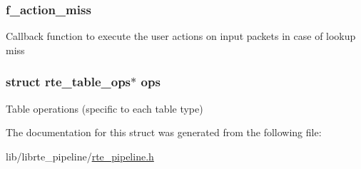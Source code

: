 \subsubsection[{f\+\_\+action\+\_\+miss}]{ f\+\_\+action\+\_\+miss}\label{structrte__pipeline__table__params_aaa5e9294a7d2b1c271683726263fcb46}
Callback function to execute the user actions on input packets in case of lookup miss \hypertarget{structrte__pipeline__table__params_ad1966fbeee5c7e1923a4e567b5bcd77d}{}
\subsubsection[{ops}]{\setlength{\rightskip}{0pt plus 5cm}struct {\bf rte\+\_\+table\+\_\+ops}$\ast$ ops}\label{structrte__pipeline__table__params_ad1966fbeee5c7e1923a4e567b5bcd77d}
Table operations (specific to each table type) 

The documentation for this struct was generated from the following file\+:\begin{DoxyCompactItemize}
\item 
lib/librte\+\_\+pipeline/\hyperlink{rte__pipeline_8h}{rte\+\_\+pipeline.\+h}\end{DoxyCompactItemize}
